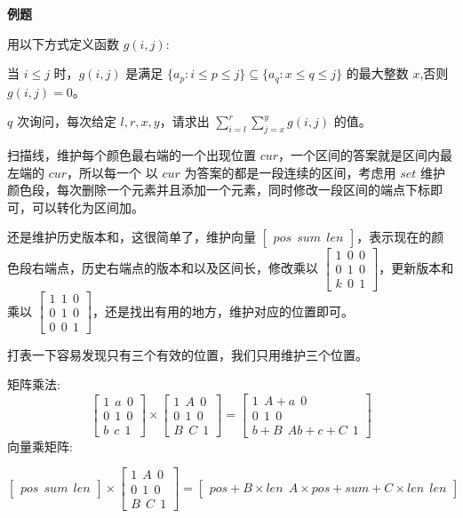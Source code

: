 \documentclass[a4paper]{ctexart}
\begin{document}
\textbf{例题}

用以下方式定义函数 $g(i,j)$:

当 $i\le j$ 时，$g(i,j)$ 是满足 $ \{a_p:i\le p\le j\}\subseteq\{a_q:x\le q\le j\} $ 的最大整数 $x$,否则 $g(i,j)=0$。

$q$ 次询问，每次给定 $l,r,x,y$，请求出 $\sum\limits_{i=l}^r\sum\limits_{j=x}^y g(i,j)$ 的值。

扫描线，维护每个颜色最右端的一个出现位置 $cur$，一个区间的答案就是区间内最左端的 $cur$，所以每一个 以 $cur$ 为答案的都是一段连续的区间，考虑用 $set$ 维护颜色段，每次删除一个元素并且添加一个元素，同时修改一段区间的端点下标即可，可以转化为区间加。

还是维护历史版本和，这很简单了，维护向量 $\begin{bmatrix}pos \ \ sum \ \ len\end{bmatrix}$，表示现在的颜色段右端点，历史右端点的版本和以及区间长，修改乘以 $\begin{bmatrix}1 \ \ 0 \ \ 0\\0 \ \ 1 \ \ 0\\k \ \ 0 \ \ 1\end{bmatrix}$，更新版本和乘以 $\begin{bmatrix}1 \ \ 1 \ \ 0\\0 \ \ 1 \ \ 0\\0 \ \ 0 \ \ 1\end{bmatrix}$，还是找出有用的地方，维护对应的位置即可。

打表一下容易发现只有三个有效的位置，我们只用维护三个位置。

矩阵乘法:
$$
\begin{bmatrix}1 \ \ a \ \ 0\\0 \ \ 1 \ \ 0\\b \ \ c \ \ 1\end{bmatrix}\times \begin{bmatrix}1 \ \ A \ \ 0\\0 \ \ 1 \ \ 0\\B \ \ C \ \ 1\end{bmatrix}=\begin{bmatrix}1 \ \ A+a \ \ 0\\0 \ \ 1 \ \ 0\\b+B \ \ Ab+c+C \ \ 1\end{bmatrix}
$$
向量乘矩阵:

$\begin{bmatrix}pos \ \ sum \ \ len\end{bmatrix}\times\begin{bmatrix}1 \ \ A \ \ 0\\0 \ \ 1 \ \ 0\\B \ \ C \ \ 1\end{bmatrix}=\begin{bmatrix}pos+B\times len \ \ A\times pos+sum+C\times len \ \ len\end{bmatrix}$
\end{document}
